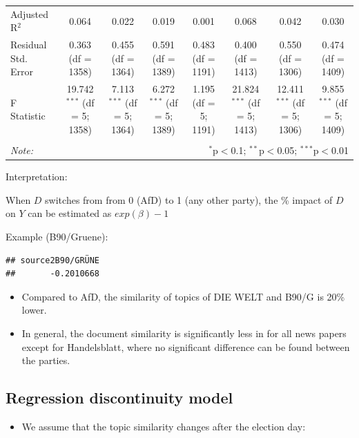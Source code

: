 \documentclass[
]{article}
\providecommand{\tightlist}{%
  \setlength{\itemsep}{0pt}\setlength{\parskip}{0pt}}
\begin{document}
\begin{table}[!htbp]
\begin{tabular}{@{\extracolsep{5pt}}lccccccc}
Adjusted R$^{2}$ & 0.064 & 0.022 & 0.019 & 0.001 & 0.068 & 0.042 & 0.030 \\ 
Residual Std. Error & 0.363 (df = 1358) & 0.455 (df = 1364) & 0.591 (df = 1389) & 0.483 (df = 1191) & 0.400 (df = 1413) & 0.550 (df = 1306) & 0.474 (df = 1409) \\ 
F Statistic & 19.742$^{***}$ (df = 5; 1358) & 7.113$^{***}$ (df = 5; 1364) & 6.272$^{***}$ (df = 5; 1389) & 1.195 (df = 5; 1191) & 21.824$^{***}$ (df = 5; 1413) & 12.411$^{***}$ (df = 5; 1306) & 9.855$^{***}$ (df = 5; 1409) \\ 
\hline 
\hline \\[-1.8ex] 
\textit{Note:}  & \multicolumn{7}{r}{$^{*}$p$<$0.1; $^{**}$p$<$0.05; $^{***}$p$<$0.01} \\ 
\end{tabular} 
\end{table}

Interpretation:

When \(D\) switches from from 0 (AfD) to 1 (any other party), the \%
impact of \(D\) on \(Y\) can be estimated as \(exp(\beta)-1\)

Example (B90/Gruene):

\begin{verbatim}
## source2B90/GRÜNE 
##       -0.2010668
\end{verbatim}

\begin{itemize}
\tightlist
\item
  Compared to AfD, the similarity of topics of DIE WELT and B90/G is
  20\% lower.
\item
  In general, the document similarity is significantly less in for all
  news papers except for Handelsblatt, where no significant difference
  can be found between the parties.
\end{itemize}

\hypertarget{regression-discontinuity-model}{%
\subsection{Regression discontinuity
model}\label{regression-discontinuity-model}}

\begin{itemize}
\tightlist
\item
  We assume that the topic similarity changes after the election day:
\end{itemize}
\end{document}
